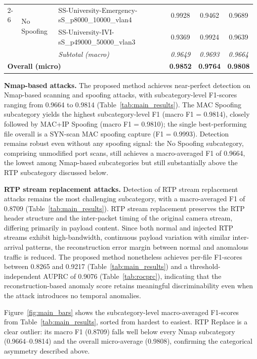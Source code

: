 \begin{table}[!tbp]
{\begin{tabular}{lllccc}
\cmidrule(l){2-6}
 & \multirow[c]{2}{*}{No Spoofing}
 & SS-University-Emergency-sS\_p8000\_10000\_vlan4          & 0.9928 & 0.9462 & 0.9689 \\
 & & SS-University-IVI-sS\_p49000\_50000\_vlan3               & 0.9369 & 0.9924 & 0.9639 \\
\addlinespace[2pt]
 & & \textit{Subtotal (macro)}                      & \textit{0.9649} & \textit{0.9693} & \textit{0.9664} \\
\midrule
\multicolumn{3}{l}{\textbf{Overall (micro)}} & \textbf{0.9852} & \textbf{0.9764} & \textbf{0.9808} \\
\bottomrule
\end{tabular}}
\end{table}

\noindent\textbf{Nmap-based attacks.} The proposed method achieves near-perfect detection on Nmap-based scanning and spoofing attacks, with subcategory-level F1-scores ranging from 0.9664 to 0.9814 (Table~\ref{tab:main_results}). The MAC Spoofing subcategory yields the highest subcategory-level F1 (macro F1 = 0.9814), closely followed by MAC+IP Spoofing (macro F1 = 0.9810); the single best-performing file overall is a SYN-scan MAC spoofing capture (F1 = 0.9993). Detection remains robust even without any spoofing signal: the No Spoofing subcategory, comprising unmodified port scans, still achieves a macro-averaged F1 of 0.9664, the lowest among Nmap-based subcategories but still substantially above the RTP subcategory discussed below.

\noindent\textbf{RTP stream replacement attacks.} Detection of RTP stream replacement attacks remains the most challenging subcategory, with a macro-averaged F1 of 0.8709 (Table~\ref{tab:main_results}). RTP stream replacement preserves the RTP header structure and the inter-packet timing of the original camera stream, differing primarily in payload content. Since both normal and injected RTP streams exhibit high-bandwidth, continuous payload variation with similar inter-arrival patterns, the reconstruction error margin between normal and anomalous traffic is reduced. The proposed method nonetheless achieves per-file F1-scores between 0.8265 and 0.9217 (Table~\ref{tab:main_results}) and a threshold-independent AUPRC of 0.9076 (Table~\ref{tab:rocprc}), indicating that the reconstruction-based anomaly score retains meaningful discriminability even when the attack introduces no temporal anomalies.

Figure~\ref{fig:main_bars} shows the subcategory-level macro-averaged F1-scores from Table~\ref{tab:main_results}, sorted from hardest to easiest. RTP Replace is a clear outlier: its macro F1 (0.8709) falls well below every Nmap subcategory (0.9664--0.9814) and the overall micro-average (0.9808), confirming the categorical asymmetry described above.

